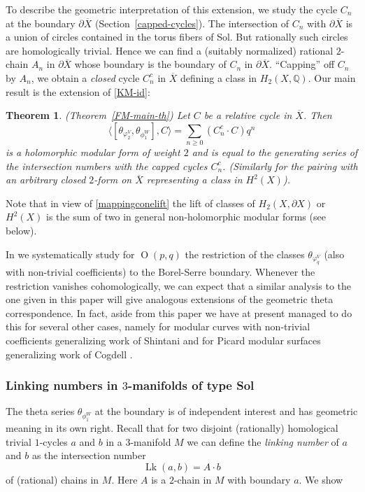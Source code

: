 \documentclass[12pt,leqno]{amsart}
\numberwithin{equation}{section}
\theoremstyle{plain}
\newtheorem{theorem}{Theorem}[section]
\theoremstyle{definition}
\theoremstyle{remark}
\newcommand{\Q}{\mathbb{Q}}
\newcommand{\Orth}{\operatorname{O}}
\newcommand{\Lk}{\operatorname{Lk}}
\begin{document}
To describe the geometric interpretation of this extension, we study the cycle $C_n$ at the boundary $\partial \overline{X}$ (Section~\ref{capped-cycles}). The intersection of $C_n$ with $\partial \overline{X}$ is a union of circles contained in the torus fibers of Sol. But rationally such circles are homologically trivial. Hence we can find a (suitably normalized) rational $2$-chain $A_n$ in $\partial \overline{X}$ whose boundary is the boundary of $C_n$ in $\partial \overline{X}$. ``Capping'' off $C_n$ by $A_n$, we obtain a {\it closed} cycle $C_n^c$ in $\overline{X}$ defining a class in $H_2({X},\Q)$. Our main result is the extension of \eqref{KM-id}:
\begin{theorem}\label{FMHZ-main} (Theorem~\ref{FM-main-th})
 Let $C$ be a relative cycle in $\overline{X}$. Then
\[
\langle [\theta_{\varphi^V_{2}}, \theta_{\phi_1^W}], C \rangle  = \sum_{n \geq 0} (C_n^c \cdot C)q^n
\]
is a holomorphic modular form of weight $2$ and is equal to the generating series of the  intersection numbers with the capped cycles $C^c_n$. (Similarly for the pairing with an arbitrary closed $2$-form on $\overline{X}$ representing a class in $H^2(X)$).
\end{theorem}

 Note that in view of \eqref{mappingconelift} the lift of classes of $H_2({X}, \partial {X})$ or $H^2(X)$ is the sum of two in general non-holomorphic modular forms (see below).

In \cite{FMres} we systematically study for $\Orth(p,q)$ the restriction of the classes $\theta_{\varphi^V_{q}}$ (also with non-trivial coefficients) to the Borel-Serre boundary. Whenever the restriction vanishes cohomologically, we can expect that a similar analysis to the one given in this paper will give analogous extensions of the geometric theta correspondence. In fact, aside from this paper we have at present managed to do this for several other cases, namely for modular curves with non-trivial coefficients \cite{FMspec} generalizing work of Shintani \cite{Shintani} and for Picard modular surfaces \cite{FM-Cogdell} generalizing work of Cogdell \cite{Cogdell}. 



\subsubsection*{Linking numbers in $3$-manifolds of type Sol}

The theta series $\theta_{\phi_1^W}$ at the boundary is of independent interest and has geometric meaning in its own right. Recall that for two disjoint (rationally) homological trivial $1$-cycles $a$ and $b$ in a $3$-manifold $M$ we can define the {\it linking number} of $a$ and $b$ as the intersection number 
\[
\Lk(a,b) = A \cdot b
\]
of (rational) chains in $M$. Here $A$ is a $2$-chain in $M$ with boundary $a$. We show 
\end{document}
